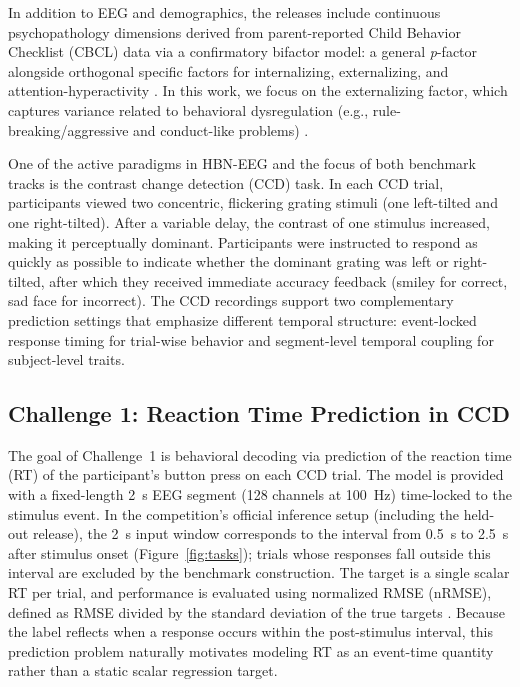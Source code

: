 \documentclass[12pt]{article}
\begin{document}
In addition to EEG and demographics, the releases include continuous psychopathology dimensions derived from parent-reported
Child Behavior Checklist (CBCL) data via a confirmatory bifactor model: a general \emph{p}-factor alongside orthogonal
specific factors for internalizing, externalizing, and attention-hyperactivity \citep{HBN_Factsheet_EEGChallenge}.
In this work, we focus on the externalizing factor, which captures variance related to behavioral dysregulation
(e.g., rule-breaking/aggressive and conduct-like problems) \citep{HBN_Factsheet_EEGChallenge}.

One of the active paradigms in HBN-EEG and the focus of both benchmark tracks is the contrast change detection (CCD) task.
In each CCD trial, participants viewed two concentric, flickering grating stimuli (one left-tilted and one right-tilted).
After a variable delay, the contrast of one stimulus increased, making it perceptually dominant. Participants were
instructed to respond as quickly as possible to indicate whether the dominant grating was left or right-tilted, after which
they received immediate accuracy feedback (smiley for correct, sad face for incorrect). The CCD recordings support two
complementary prediction settings that emphasize different temporal structure: event-locked response timing for trial-wise
behavior and segment-level temporal coupling for subject-level traits.

\subsection{Challenge 1: Reaction Time Prediction in CCD}
The goal of Challenge~1 is behavioral decoding via prediction of the reaction time (RT) of the participant's button press
on each CCD trial. The model is provided with a fixed-length 2~s EEG segment (128 channels at 100~Hz)
time-locked to the stimulus event. In the competition's official inference setup (including the held-out release), the
2~s input window corresponds to the interval from 0.5~s to 2.5~s after stimulus onset (Figure~\ref{fig:tasks});
trials whose responses fall outside this interval are excluded by the benchmark construction.
The target is a single scalar RT per trial, and performance is evaluated using normalized RMSE (nRMSE), defined as RMSE
divided by the standard deviation of the true targets \citep{EEGChallengeWebsite2025}. Because the label reflects when a
response occurs within the post-stimulus interval, this prediction problem naturally motivates modeling RT as an event-time
quantity rather than a static scalar regression target.
\end{document}
